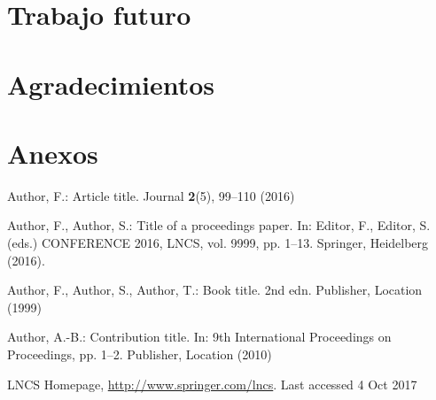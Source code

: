 \documentclass[runningheads]{llncs}
\begin{document}
\section{Trabajo futuro}

%
\section{Agradecimientos}

%
\section{Anexos}

%
%
%
% 
% 
%
\begin{thebibliography}{8}
Author, F.: Article title. Journal \textbf{2}(5), 99--110 (2016)

Author, F., Author, S.: Title of a proceedings paper. In: Editor,
F., Editor, S. (eds.) CONFERENCE 2016, LNCS, vol. 9999, pp. 1--13.
Springer, Heidelberg (2016). 

Author, F., Author, S., Author, T.: Book title. 2nd edn. Publisher,
Location (1999)

Author, A.-B.: Contribution title. In: 9th International Proceedings
on Proceedings, pp. 1--2. Publisher, Location (2010)

LNCS Homepage, \url{http://www.springer.com/lncs}. Last accessed 4
Oct 2017
\end{thebibliography}
\end{document}
